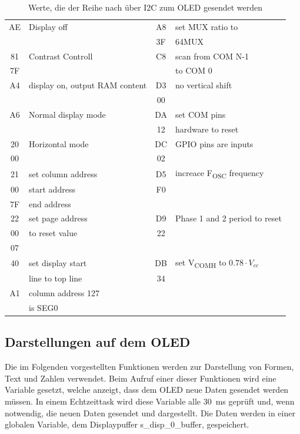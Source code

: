 \begin{table}[H]
\centering
	\begin{tabular}{|c|l||c|l|}
	\hline
	AE&Display off&A8&set MUX ratio to\\
	&&3F&64MUX\\
	\hline
	81&Contrast Controll&C8&scan from COM N-1\\
	7F&&&to COM 0\\
	\hline
	A4&display on, output RAM content&D3&no vertical shift\\
	&&00&\\
	\hline
	A6&Normal display mode&DA&set COM pins\\
	&&12&hardware to reset\\
	\hline
	20&Horizontal mode&DC&GPIO pins are inputs\\
	00&&02&\\
	\hline
	21&set column address&D5&increace F\textsubscript{OSC} frequency\\
	00&start address&F0&\\
	7F&end address&&\\
	\hline
	22&set page address&D9&Phase 1 and 2 period to reset\\
	00&to reset value&22&\\
	07&&&\\
	\hline
	40&set display start&DB&set V\textsubscript{COMH} to $0.78 \cdot V_{cc}$\\
	&line to top line&34&\\
	\hline
	A1&column address 127&&\\
	&is SEG0&&\\
	\hline
	\end{tabular}
	\caption[Initialisierungswert \ac{OLED}]{Werte, die der Reihe nach über \ac{I2C} zum \ac{OLED} gesendet werden}
	\label{tab:InitOLED}
\end{table}


\subsection{Darstellungen auf dem \acl{OLED}}\label{sec:OLEDDarstellen}
Die im Folgenden vorgestellten Funktionen werden zur Darstellung von Formen, Text und Zahlen verwendet. Beim Aufruf einer dieser Funktionen wird eine Variable gesetzt, welche anzeigt, dass dem \ac{OLED} neue Daten gesendet werden müssen. In einem Echtzeittask wird diese Variable alle \SI{30}{\milli\second} geprüft und, wenn notwendig, die neuen Daten gesendet und dargestellt. Die Daten werden in einer globalen Variable, dem Displaypuffer \glqq s\_disp\_0\_buffer\grqq{}, gespeichert.


